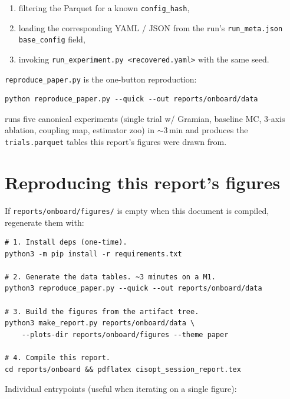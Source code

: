 \documentclass[11pt]{article}
\begin{document}
\begin{enumerate}[leftmargin=2em]
\item filtering the Parquet for a known \texttt{config\_hash},
\item loading the corresponding YAML / JSON from the run's
      \texttt{run\_meta.json} \texttt{base\_config} field,
\item invoking \texttt{run\_experiment.py <recovered.yaml>} with the
      same seed.
\end{enumerate}

\noindent
\texttt{reproduce\_paper.py} is the one-button reproduction:

\begin{lstlisting}[language=shell]
python reproduce_paper.py --quick --out reports/onboard/data
\end{lstlisting}

\noindent
runs five canonical experiments (single trial w/ Gramian, baseline MC,
$3$-axis ablation, coupling map, estimator zoo) in $\sim\!3\,\textrm{min}$
and produces the \texttt{trials.parquet} tables this report's figures
were drawn from.

\section{Reproducing this report's figures}

If \texttt{reports/onboard/figures/} is empty when this document is
compiled, regenerate them with:

\begin{lstlisting}[language=shell]
# 1. Install deps (one-time).
python3 -m pip install -r requirements.txt

# 2. Generate the data tables. ~3 minutes on a M1.
python3 reproduce_paper.py --quick --out reports/onboard/data

# 3. Build the figures from the artifact tree.
python3 make_report.py reports/onboard/data \
    --plots-dir reports/onboard/figures --theme paper

# 4. Compile this report.
cd reports/onboard && pdflatex cisopt_session_report.tex
\end{lstlisting}

\noindent
Individual entrypoints (useful when iterating on a single figure):
\end{document}
